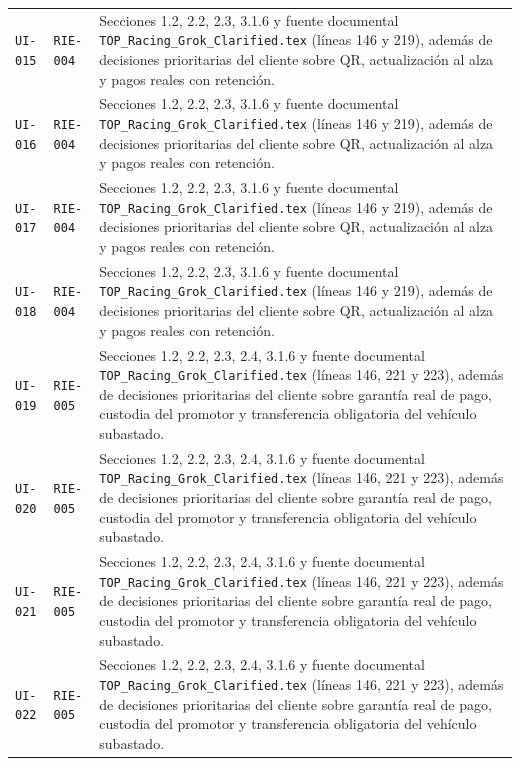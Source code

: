 \documentclass[10pt,letterpaper]{article}
\begin{document}
\begin{landscape}
\begin{longtable}{P{2.7cm}P{2.6cm}P{15.7cm}}
\texttt{UI-015} & \texttt{RIE-004} & Secciones 1.2, 2.2, 2.3, 3.1.6 y fuente documental \texttt{TOP\_Racing\_Grok\_Clarified.tex} (líneas 146 y 219), además de decisiones prioritarias del cliente sobre QR, actualización al alza y pagos reales con retención.\\
\texttt{UI-016} & \texttt{RIE-004} & Secciones 1.2, 2.2, 2.3, 3.1.6 y fuente documental \texttt{TOP\_Racing\_Grok\_Clarified.tex} (líneas 146 y 219), además de decisiones prioritarias del cliente sobre QR, actualización al alza y pagos reales con retención.\\
\texttt{UI-017} & \texttt{RIE-004} & Secciones 1.2, 2.2, 2.3, 3.1.6 y fuente documental \texttt{TOP\_Racing\_Grok\_Clarified.tex} (líneas 146 y 219), además de decisiones prioritarias del cliente sobre QR, actualización al alza y pagos reales con retención.\\
\texttt{UI-018} & \texttt{RIE-004} & Secciones 1.2, 2.2, 2.3, 3.1.6 y fuente documental \texttt{TOP\_Racing\_Grok\_Clarified.tex} (líneas 146 y 219), además de decisiones prioritarias del cliente sobre QR, actualización al alza y pagos reales con retención.\\
\texttt{UI-019} & \texttt{RIE-005} & Secciones 1.2, 2.2, 2.3, 2.4, 3.1.6 y fuente documental \texttt{TOP\_Racing\_Grok\_Clarified.tex} (líneas 146, 221 y 223), además de decisiones prioritarias del cliente sobre garantía real de pago, custodia del promotor y transferencia obligatoria del vehículo subastado.\\
\texttt{UI-020} & \texttt{RIE-005} & Secciones 1.2, 2.2, 2.3, 2.4, 3.1.6 y fuente documental \texttt{TOP\_Racing\_Grok\_Clarified.tex} (líneas 146, 221 y 223), además de decisiones prioritarias del cliente sobre garantía real de pago, custodia del promotor y transferencia obligatoria del vehículo subastado.\\
\texttt{UI-021} & \texttt{RIE-005} & Secciones 1.2, 2.2, 2.3, 2.4, 3.1.6 y fuente documental \texttt{TOP\_Racing\_Grok\_Clarified.tex} (líneas 146, 221 y 223), además de decisiones prioritarias del cliente sobre garantía real de pago, custodia del promotor y transferencia obligatoria del vehículo subastado.\\
\texttt{UI-022} & \texttt{RIE-005} & Secciones 1.2, 2.2, 2.3, 2.4, 3.1.6 y fuente documental \texttt{TOP\_Racing\_Grok\_Clarified.tex} (líneas 146, 221 y 223), además de decisiones prioritarias del cliente sobre garantía real de pago, custodia del promotor y transferencia obligatoria del vehículo subastado.\\

\end{longtable}
\end{landscape}
\end{document}
